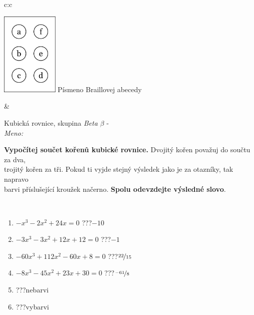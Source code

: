 \documentclass[10pt]{report}
\begin{document}
\begin{tabular}{c:c}
\begin{minipage}[c][104.5mm][t]{0.5\linewidth}
\begin{center}
\begin{minipage}{0.20\linewidth}
\begin{center}
\includegraphics[height=40mm]{../images/braille.png}
{\small Písmeno Braillovej abecedy}
\end{center}
\end{minipage}
\end{center}
\end{minipage}
&
\begin{minipage}[c][104.5mm][t]{0.5\linewidth}
\begin{center}
\vspace{7mm}
{\huge Kubická rovnice, skupina \textit{Beta $\beta$} -}\\[5mm]
\textit{Meno:}\phantom{xxxxxxxxxxxxxxxxxxxxxxxxxxxxxxxxxxxxxxxxxxxxxxxxxxxxxxxxxxxxxxxxx}\\[5mm]
\begin{minipage}{0.95\linewidth}
\textbf{Vypočítej součet kořenů kubické rovnice.} Dvojitý kořen považuj do součtu za dva,\\trojitý kořen za tři. Pokud ti vyjde stejný výsledek jako je za otazníky, tak napravo\\barvi příslušející kroužek načerno. \textbf{Spolu odevzdejte výsledné slovo}.
\end{minipage}
\\[1mm]
\begin{minipage}{0.79\linewidth}
\begin{center}
\begin{varwidth}{\linewidth}
\begin{enumerate}
\Large
\item $-x^3-2x^2+24x=0$\quad \dotfill\; ???\;\dotfill \quad $-10$
\item $-3x^3-3x^2+12x+12=0$\quad \dotfill\; ???\;\dotfill \quad $-1$
\item $-60x^3+112x^2-60x+8=0$\quad \dotfill\; ???\;\dotfill \quad $\nicefrac{22}{15}$
\item $-8x^3-45x^2+23x+30=0$\quad \dotfill\; ???\;\dotfill \quad $\nicefrac{-61}{8}$
\item \quad \dotfill\; ???\;\dotfill \quad nebarvi
\item \quad \dotfill\; ???\;\dotfill \quad vybarvi

\end{enumerate}
\end{varwidth}
\end{center}
\end{minipage}
\end{center}
\end{minipage}
\end{tabular}
\end{document}
